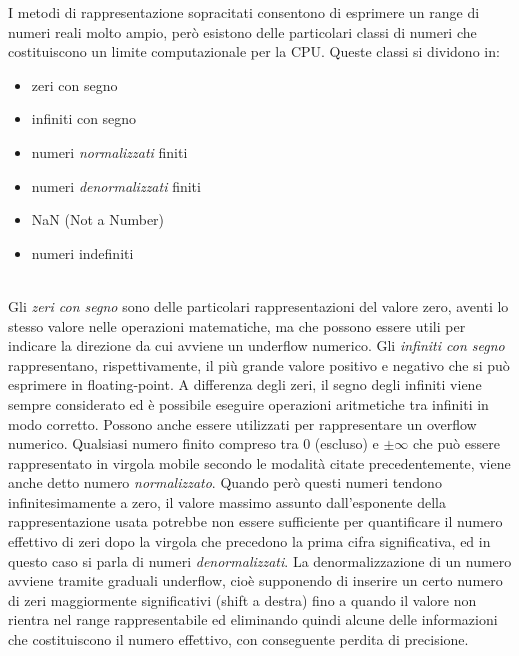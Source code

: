 \documentclass[Lau, oneside]{sapthesis}%
\begin{document}
\newpage
I metodi di rappresentazione sopracitati consentono di esprimere un range di numeri reali molto ampio, però esistono delle particolari classi di numeri che costituiscono un limite computazionale per la CPU.
\newline \newline
Queste classi si dividono in:
\begin{itemize}
    \item zeri con segno
    \item infiniti con segno
    \item numeri \textit{normalizzati} finiti
    \item numeri \textit{denormalizzati} finiti
    \item NaN (Not a Number)
    \item numeri indefiniti
\end{itemize}
\ \\
Gli \textit{zeri con segno} sono delle particolari rappresentazioni del valore zero, aventi lo stesso valore nelle operazioni matematiche, ma che possono essere utili per indicare la direzione da cui avviene un underflow numerico.
\newline \newline
Gli \textit{infiniti con segno} rappresentano, rispettivamente, il più grande valore positivo e negativo che si può esprimere in floating-point.
\newline
A differenza degli zeri, il segno degli infiniti viene sempre considerato ed è possibile eseguire operazioni aritmetiche tra infiniti in modo corretto.
\newline
Possono anche essere utilizzati per rappresentare un overflow numerico.
\newline \newline
Qualsiasi numero finito compreso tra 0 (escluso) e $\pm \infty$ che può essere rappresentato in virgola mobile secondo le modalità citate precedentemente, viene anche detto numero \textit{normalizzato}.
\newline
Quando però questi numeri tendono infinitesimamente a zero, il valore massimo assunto dall'esponente della rappresentazione usata potrebbe non essere sufficiente per quantificare il numero effettivo di zeri dopo la virgola che precedono la prima cifra significativa, ed in questo caso si parla di numeri \textit{denormalizzati}.
\newline
La denormalizzazione di un numero avviene tramite graduali underflow, cioè supponendo di inserire un certo numero di zeri maggiormente significativi (shift a destra) fino a quando il valore non rientra nel range rappresentabile ed eliminando quindi alcune delle informazioni che costituiscono il numero effettivo, con conseguente perdita di precisione.
\end{document}
